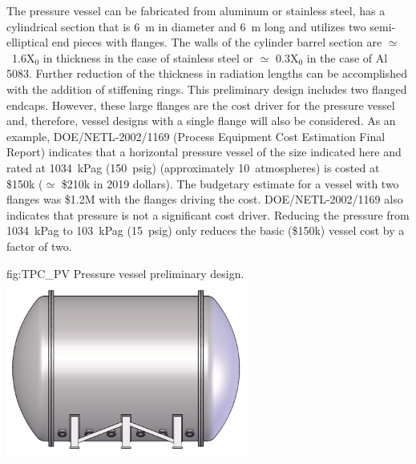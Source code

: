 The pressure vessel can be fabricated from aluminum or stainless steel, has a cylindrical section that is 6~m in diameter and \SI{6}{m} long and utilizes two semi-elliptical end pieces with flanges. The walls of the cylinder barrel section are $\simeq$~1.6X$_0$ in thickness in the case of stainless steel or $\simeq$ 0.3X$_0$ in the case of Al 5083.  Further reduction of the thickness in radiation lengths can be accomplished  with the addition of stiffening rings.   This preliminary design includes two flanged endcaps.  However, these large flanges are the cost driver for the pressure vessel and, therefore, vessel designs with a single flange will also be considered.  As an example, DOE/NETL-2002/1169 (Process Equipment Cost Estimation
Final Report) indicates that a horizontal pressure vessel of the size indicated here and rated at \SI{1034}{kPag} (\SI{150}{psig}) (approximately 10~atmospheres) is costed at \$150k ($\simeq$ \$210k in 2019 dollars).  The budgetary estimate for a vessel with two flanges was \$1.2M with the flanges driving the cost.  DOE/NETL-2002/1169 also indicates that pressure is not a significant cost driver.  Reducing the pressure from \SI{1034}{kPag} to \SI{103}{kPag} (\SI{15}{psig}) only reduces the basic (\$150k) vessel cost by a factor of two.

\begin{dunefigure}{fig:TPC_PV}
{Pressure vessel preliminary design.}
\includegraphics[width=0.6\textwidth]{graphics/tpc_pressurevessel.png}
\end{dunefigure}


